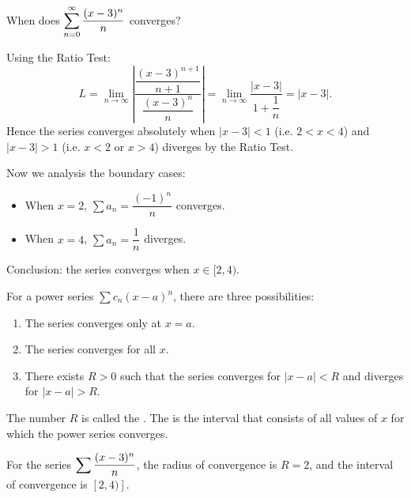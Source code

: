 \begin{ex}
    When does $\displaystyle\sum_{n=0}^\infty \dfrac{(x-3)^n}{n}$ converges?

    Using the Ratio Test:
    \[ L = \lim_{n\to \infty} \left| \dfrac{\dfrac{(x-3)^{n+1}}{n+1}}{\dfrac{(x-3)^n}{n}}\right| = \lim_{n\to \infty} \dfrac{|x-3|}{1+\dfrac{1}{n}} = |x-3|.\]
    Hence the series converges absolutely when $|x-3|<1$ (i.e. $2<x<4$) and $|x-3|>1$ (i.e. $x<2$ or $x>4$) diverges by the Ratio Test. 
    
    Now we analysis the boundary cases:
    
    \begin{itemize}
        \item When $x=2$, $\sum a_n = \dfrac{(-1)^n}{n}$ converges.

        \item When $x=4$, $\sum a_n = \dfrac{1}{n}$ diverges.
    \end{itemize}

    Conclusion: the series converges when $x \in [2,4)$.
\end{ex}

\begin{thm}
    For a power series $\sum c_n (x-a)^n$, there are three possibilities:
    \begin{enumerate}
        \item The series converges only at $x=a$.
        \item The series converges for all $x$.
        \item There exists $R > 0$ such that the series converges for $|x-a| < R$ and diverges for $|x-a| > R$.
    \end{enumerate}
\end{thm}

\begin{defn}
    The number $R$ is called the . The  is the interval that consists of all values of $x$ for which the power series converges.
\end{defn}

\begin{ex}
    For the series $\displaystyle\sum \dfrac{(x-3)^n}{n}$, the radius of convergence is $R = 2$, and the interval of convergence is $[2,4)]$.
\end{ex}

